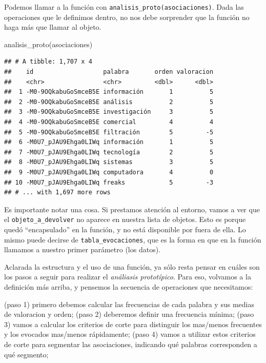 \documentclass[
]{book}
\newenvironment{Shaded}{\begin{snugshade}}{\end{snugshade}}
\newcommand{\FunctionTok}[1]{\textcolor[rgb]{0.00,0.00,0.00}{#1}}
\newcommand{\NormalTok}[1]{#1}
\begin{document}
Podemos llamar a la función con \texttt{analisis\_proto(asociaciones)}. Dada las operaciones que le definimos dentro, no nos debe sorprender que la función no haga más que llamar al objeto.

\begin{Shaded}
\begin{Highlighting}[]
\FunctionTok{analisis\_proto}\NormalTok{(asociaciones) }
\end{Highlighting}
\end{Shaded}

\begin{verbatim}
## # A tibble: 1,707 x 4
##    id                   palabra       orden valoracion
##    <chr>                <chr>         <dbl>      <dbl>
##  1 -M0-9OQkabuGoSmceB5E información       1          5
##  2 -M0-9OQkabuGoSmceB5E análisis          2          5
##  3 -M0-9OQkabuGoSmceB5E investigación     3          5
##  4 -M0-9OQkabuGoSmceB5E comercial         4          4
##  5 -M0-9OQkabuGoSmceB5E filtración        5         -5
##  6 -M0U7_pJAU9Ehga0LIWq información       1          5
##  7 -M0U7_pJAU9Ehga0LIWq tecnología        2          5
##  8 -M0U7_pJAU9Ehga0LIWq sistemas          3          5
##  9 -M0U7_pJAU9Ehga0LIWq computadora       4          0
## 10 -M0U7_pJAU9Ehga0LIWq freaks            5         -3
## # ... with 1,697 more rows
\end{verbatim}

Es importante notar una cosa. Si prestamos atención al entorno, vamos a ver que el \texttt{objeto\_a\_devolver} no aparece en nuestra lista de objetos. Esto es porque quedó ``encapsulado'' en la función, y no está disponible por fuera de ella. Lo mismo puede decirse de \texttt{tabla\_evocaciones}, que es la forma en que en la función llamamos a nuestro primer parámetro (los datos).

Aclarada la estructura y el uso de una función, ya sólo resta pensar en cuáles son los pasos a seguir para realizar el \emph{análiasis prototípico}. Para eso, volvamos a la definición más arriba, y pensemos la secuencia de operaciones que necesitamos:

(paso 1) primero debemos calcular las frecuencias de cada palabra y sus medias de valoracion y orden;
(paso 2) deberemos definir una frecuencia mínima;
(paso 3) vamos a calcular los criterios de corte para distinguir los mas/menos frecuentes y los evocados mas/menos rápidamente;
(paso 4) vamos a utilizar estos criterios de corte para segmentar las asociaciones, indicando qué palabras corresponden a qué segmento;
\end{document}

